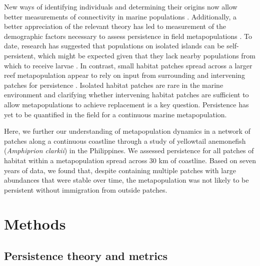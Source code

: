 \documentclass[12pt, oneside]{article}   	%
\begin{document}
New ways of identifying individuals and determining their origins now allow better measurements of connectivity in marine populations \citep{almany2017larval, daloia_self-recruitment_2013}. Additionally, a better appreciation of the relevant theory has led to measurement of the demographic factors necessary to assess persistence in field metapopulations \citep{carson2011evaluating, hameed2016inverse, johnson2018integrating, salles_coral_2015}. To date, research has suggested that populations on isolated islands can be self-persistent, which might be expected given that they lack nearby populations from which to receive larvae \citep{salles_coral_2015}. In contrast, small habitat patches spread across a larger reef metapopulation appear to rely on input from surrounding and intervening patches for persistence \citep{johnson2018integrating}. Isolated habitat patches are rare in the marine environment and clarifying whether intervening habitat patches are sufficient to allow metapopulations to achieve replacement is a key question. Persistence has yet to be quantified in the field for a continuous marine metapopulation. 

Here, we further our understanding of metapopulation dynamics in a network of patches along a continuous coastline through a study of yellowtail anemonefish (\textit{Amphiprion clarkii}) in the Philippines. We assessed persistence for all patches of habitat within a metapopulation spread across 30 km of coastline. Based on seven years of data, we found that, despite containing multiple patches with large abundances that were stable over time, the metapopulation was not likely to be persistent without immigration from outside patches.

\section*{Methods}

\subsection*{Persistence theory and metrics}
\end{document}
